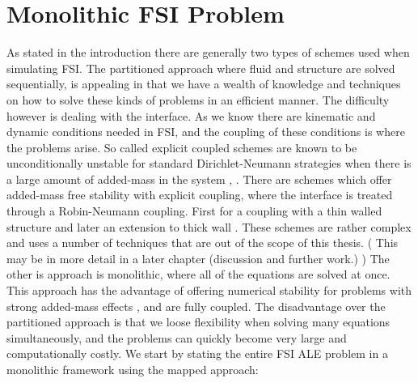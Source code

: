 \section*{Monolithic FSI Problem}
As stated in the introduction there are generally two types of schemes used when simulating FSI. The partitioned approach where fluid and structure are solved sequentially, is appealing in that we have a wealth of knowledge and techniques on how to solve these kinds of problems in an efficient manner. The difficulty however is dealing with the interface. As we know there are kinematic and dynamic conditions needed in FSI, and the coupling of these conditions is where the problems arise. So called explicit coupled schemes are known to be unconditionally unstable for standard Dirichlet-Neumann strategies when there is a large amount of added-mass in the system \cite{Fernandez2015}, \cite{VanBrummelen2009}. There are schemes which offer added-mass free stability with explicit coupling, where the interface is treated through a Robin-Neumann coupling. First for a coupling with a thin walled structure \cite{Fernandez2013} and later an extension to thick wall \cite{Fernandez2015}. These schemes are rather complex and uses a number of techniques that are out of the scope of this thesis. ( This may be in more detail in a later chapter (discussion and further work.) ) \newline
The other is approach is monolithic, where all of the equations are solved at once. This approach has the advantage of offering numerical stability for problems with strong added-mass effects \cite{Liu2014}, and are fully coupled. The disadvantage over the partitioned approach is that we loose flexibility when solving many equations simultaneously, and the problems can quickly become very large and computationally costly. \newline
We start by stating the entire FSI ALE problem in a monolithic framework using the mapped approach: 



